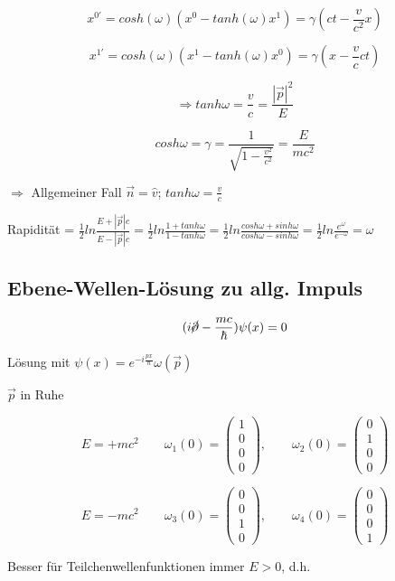 \[x^{0'} = cosh(\omega)(x^0-tanh(\omega) x^{1}) = \gamma(ct-\frac{v}{c^2}x)\]

\[x^{1'} = cosh(\omega)(x^{1}-tanh(\omega) x^0) = \gamma(x-\frac{v}{c}ct)\]

\[\Rightarrow tanh \omega = \frac{v}{c} = \frac{|\vec p|^2}{E}\]

\[cosh\omega =\gamma = \frac{1}{\sqrt{1-\frac{v^2}{c^2}}} = \frac{E}{mc^2} \]


\(\Rightarrow \) Allgemeiner Fall \(\vec n = \hat v\); \(tanh\omega = \frac{v}{c}\)


Rapidität = \(\frac{1}{2} ln\frac{E+|\vec p|c}{E-|\vec p|c} =\frac{1}{2} ln\frac{1+tanh\omega}{1-tanh\omega} = \frac{1}{2} ln\frac{cosh\omega+sinh\omega}{cosh\omega-sinh\omega}  = \frac{1}{2}ln\frac{e^\omega}{e^{-\omega}} =\omega \)


\subsection{Ebene-Wellen-Lösung zu allg. Impuls}

\[(i\cancel \partial - \frac{mc}{\hbar})\psi(x) = 0\]

Lösung mit \(\psi(x) = e^{-i\frac{px}{\hbar}}\omega(\vec p)\)

\(\vec p\) in Ruhe

\[E = +mc^2\qquad \omega_1(0) = \begin{pmatrix} 1\\ 0 \\ 0\\ 0 \end{pmatrix},\qquad \omega_2(0) = \begin{pmatrix} 0\\ 1 \\ 0\\ 0 \end{pmatrix} \]

\[E = -mc^2\qquad \omega_3(0) = \begin{pmatrix} 0\\ 0 \\ 1\\ 0 \end{pmatrix},\qquad  \omega_4(0) = \begin{pmatrix} 0\\ 0 \\ 0\\ 1 \end{pmatrix} \]

Besser für Teilchenwellenfunktionen immer \(E>0\), d.h.

